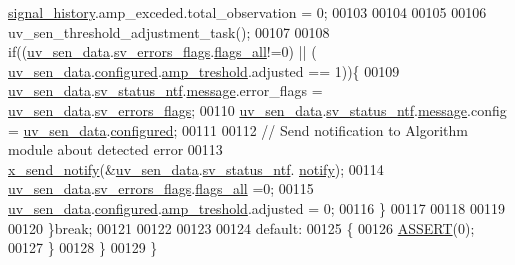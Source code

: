 \begin{DoxyCode}
      \hyperlink{a00017_affb63906d23cb1cb7787d61eaaedfb60}{signal\_history}.amp\_exceded.total\_observation   = 0;
00103 
00104 
00105 
00106              uv\_sen\_threshold\_adjustment\_task();
00107 
00108             \textcolor{keywordflow}{if}((\hyperlink{a00073_adb4cffe9b88704fe686a94fe9996fa52}{uv\_sen\_data}.\hyperlink{a00035_aaeec6b0609dba31393f337abf1cce3d3}{sv\_errors\_flags}.\hyperlink{a00022_a1caa87b00c878186140c3bac9c8acf3b}{flags\_all}!=0)  || (
      \hyperlink{a00073_adb4cffe9b88704fe686a94fe9996fa52}{uv\_sen\_data}.\hyperlink{a00035_a94b2d1f6ea4ab334c74d24984dd27843}{configured}.\hyperlink{a00021_a4b3bbfb0267daea1432f2603825ade62}{amp\_treshold}.adjusted == 1))\{
00109              \hyperlink{a00073_adb4cffe9b88704fe686a94fe9996fa52}{uv\_sen\_data}.\hyperlink{a00035_afdc0e2c51e8e301d264700f4f9c10740}{sv\_status\_ntf}.\hyperlink{a00021_a13393a2d1589483b3bae4d2e79f43980}{message}.error\_flags = 
      \hyperlink{a00073_adb4cffe9b88704fe686a94fe9996fa52}{uv\_sen\_data}.\hyperlink{a00035_aaeec6b0609dba31393f337abf1cce3d3}{sv\_errors\_flags};
00110              \hyperlink{a00073_adb4cffe9b88704fe686a94fe9996fa52}{uv\_sen\_data}.\hyperlink{a00035_afdc0e2c51e8e301d264700f4f9c10740}{sv\_status\_ntf}.\hyperlink{a00021_a13393a2d1589483b3bae4d2e79f43980}{message}.config = 
      \hyperlink{a00073_adb4cffe9b88704fe686a94fe9996fa52}{uv\_sen\_data}.\hyperlink{a00035_a94b2d1f6ea4ab334c74d24984dd27843}{configured};
00111 
00112              \textcolor{comment}{// Send notification to Algorithm module about detected error}
00113              \hyperlink{a00036_ae17b0bb16da3c471bb6074bb4c4d0fee}{x\_send\_notify}(&\hyperlink{a00073_adb4cffe9b88704fe686a94fe9996fa52}{uv\_sen\_data}.\hyperlink{a00035_afdc0e2c51e8e301d264700f4f9c10740}{sv\_status\_ntf}.
      \hyperlink{a00021_a8e6a04c2283f9fd7b8dcbc62faba5847}{notify});
00114              \hyperlink{a00073_adb4cffe9b88704fe686a94fe9996fa52}{uv\_sen\_data}.\hyperlink{a00035_aaeec6b0609dba31393f337abf1cce3d3}{sv\_errors\_flags}.\hyperlink{a00022_a1caa87b00c878186140c3bac9c8acf3b}{flags\_all} =0;
00115              \hyperlink{a00073_adb4cffe9b88704fe686a94fe9996fa52}{uv\_sen\_data}.\hyperlink{a00035_a94b2d1f6ea4ab334c74d24984dd27843}{configured}.\hyperlink{a00021_a4b3bbfb0267daea1432f2603825ade62}{amp\_treshold}.adjusted = 0;
00116             \}
00117 
00118 
00119 
00120         \}\textcolor{keywordflow}{break};
00121 
00122 
00123 
00124         \textcolor{keywordflow}{default}:
00125         \{
00126             \hyperlink{a00072_abb8ff8e213ac9f6fb21d2b968583b936}{ASSERT}(0);
00127         \}
00128     \}
00129 \}
\end{DoxyCode}


